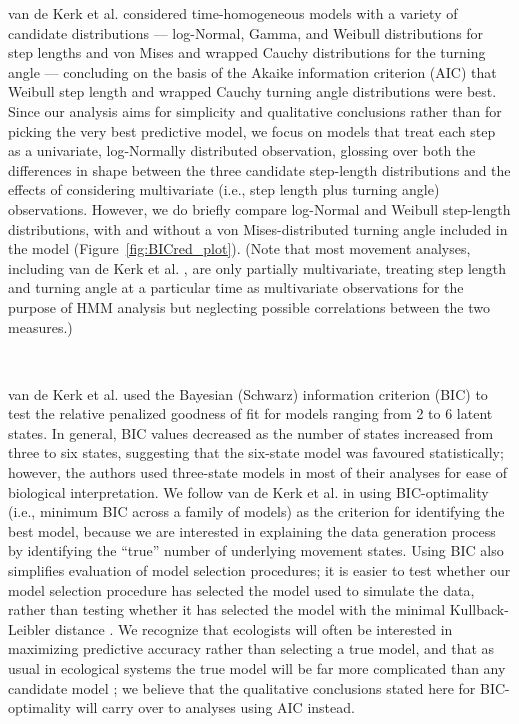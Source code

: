 \documentclass{bmcart}
\begin{document}
van de Kerk et al.\cite{kerk2015hidden} considered time-homogeneous models with 
a variety of candidate distributions %
--- log-Normal, Gamma, and Weibull distributions for step lengths
and von Mises and wrapped Cauchy distributions for the turning angle --- %
concluding on the basis of the Akaike information criterion (AIC) 
that Weibull step length and wrapped Cauchy turning angle distributions
were best.  
Since our analysis aims for simplicity and qualitative
conclusions rather than for picking the very best
predictive model, we focus on models that treat each step as
a univariate, log-Normally distributed observation, glossing
over both the differences in shape between
the three candidate step-length distributions and the effects
of considering multivariate (i.e., step length plus turning angle)
observations.  However, we do briefly compare log-Normal and Weibull
step-length distributions, with and without 
a von Mises-distributed turning angle included in the model (Figure~\ref{fig:BICred_plot}).
(Note that most movement analyses, including van de Kerk et al.
\cite{kerk2015hidden}, are only partially multivariate, 
treating step length and turning angle at a particular time
as multivariate observations for the purpose of HMM
analysis but neglecting possible correlations
between the two measures.) 

\

van de Kerk et al.\cite{kerk2015hidden} used the Bayesian (Schwarz) information criterion (BIC)
to test the relative penalized goodness of fit for
models ranging from 2 to 6 latent states.
In general, BIC values decreased as the number of states
increased from 
three to six states,
suggesting that the six-state model was
favoured statistically; however,
the authors used three-state models in most
of their analyses for ease of biological interpretation.
We follow van de Kerk et al.\cite{kerk2015hidden} in using BIC-optimality (i.e., minimum
BIC across a family of models) as the criterion for identifying
the best model, because we are interested in explaining the 
data generation process by identifying the ``true'' number 
of underlying movement states.  
Using BIC also simplifies 
evaluation of model selection procedures; 
it is easier to test whether our model selection
procedure has selected the model used to simulate the data,
rather than testing whether it has selected the model with
the minimal Kullback-Leibler distance
\cite{Richards2005}. We recognize that 
ecologists will often be interested in maximizing predictive
accuracy rather than selecting a true model, and that as
usual in ecological systems the true model will be far more
complicated than any candidate model \cite{BurnhamAnderson1998};
we believe that the qualitative conclusions stated here
for BIC-optimality will carry over to analyses using AIC instead.
\end{document}
